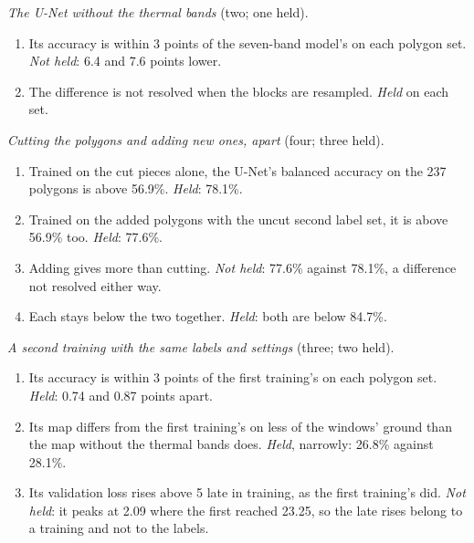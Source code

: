 \documentclass[twocolumn]{aastex701}
\begin{document}
\emph{The U-Net without the thermal bands} (two; one held).
\begin{enumerate}
\item[T1] Its accuracy is within 3 points of the seven-band model's on each polygon set. \emph{Not held}: 6.4 and 7.6
points lower.
\item[T2] The difference is not resolved when the blocks are resampled. \emph{Held} on each set.
\end{enumerate}

\emph{Cutting the polygons and adding new ones, apart} (four; three held).
\begin{enumerate}
\item[C1] Trained on the cut pieces alone, the U-Net's balanced accuracy on the 237 polygons is above 56.9\%.
\emph{Held}: 78.1\%.
\item[C2] Trained on the added polygons with the uncut second label set, it is above 56.9\% too. \emph{Held}: 77.6\%.
\item[C3] Adding gives more than cutting. \emph{Not held}: 77.6\% against 78.1\%, a difference not resolved either
way.
\item[C4] Each stays below the two together. \emph{Held}: both are below 84.7\%.
\end{enumerate}

\emph{A second training with the same labels and settings} (three; two held).
\begin{enumerate}
\item[R1] Its accuracy is within 3 points of the first training's on each polygon set. \emph{Held}: 0.74 and 0.87
points apart.
\item[R2] Its map differs from the first training's on less of the windows' ground than the map without the thermal
bands does. \emph{Held}, narrowly: 26.8\% against 28.1\%.
\item[R3] Its validation loss rises above 5 late in training, as the first training's did. \emph{Not held}: it peaks
at 2.09 where the first reached 23.25, so the late rises belong to a training and not to the labels.
\end{enumerate}
\end{document}
